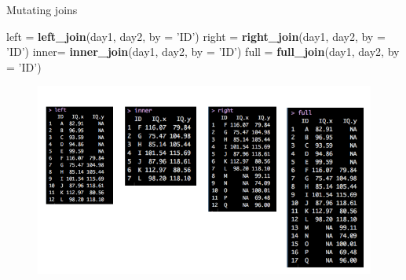 \documentclass[ignorenonframetext,]{beamer}
\newenvironment{Shaded}{\begin{snugshade}}{\end{snugshade}}
\newcommand{\KeywordTok}[1]{\textcolor[rgb]{0.13,0.29,0.53}{\textbf{#1}}}
\newcommand{\DataTypeTok}[1]{\textcolor[rgb]{0.13,0.29,0.53}{#1}}
\newcommand{\StringTok}[1]{\textcolor[rgb]{0.31,0.60,0.02}{#1}}
\newcommand{\NormalTok}[1]{#1}
\begin{document}
\begin{frame}[fragile]{Mutating joins}

\begin{Shaded}
\begin{Highlighting}[]
\NormalTok{left =}\StringTok{ }\KeywordTok{left_join}\NormalTok{(day1, day2, }\DataTypeTok{by =} \StringTok{'ID'}\NormalTok{)}
\NormalTok{right =}\StringTok{ }\KeywordTok{right_join}\NormalTok{(day1, day2, }\DataTypeTok{by =} \StringTok{'ID'}\NormalTok{)}
\NormalTok{inner=}\StringTok{ }\KeywordTok{inner_join}\NormalTok{(day1, day2, }\DataTypeTok{by =} \StringTok{'ID'}\NormalTok{)}
\NormalTok{full =}\StringTok{ }\KeywordTok{full_join}\NormalTok{(day1, day2, }\DataTypeTok{by =} \StringTok{'ID'}\NormalTok{)}
\end{Highlighting}
\end{Shaded}

\begin{figure}
\centering
\includegraphics{graphs/mutate.png}
\caption{}
\end{figure}

\end{frame}
\end{document}
